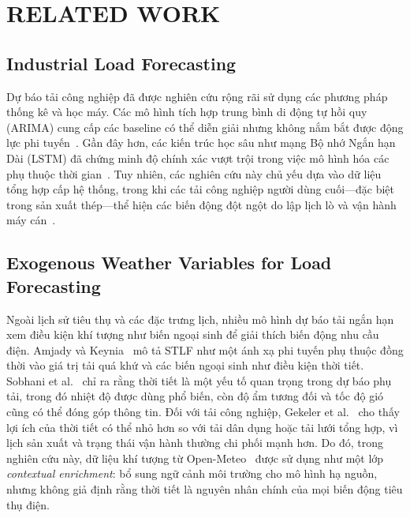 \documentclass[conference]{IEEEtran}
\begin{document}
\section{RELATED WORK}
\label{sec:related}

\subsection{Industrial Load Forecasting}

Dự báo tải công nghiệp đã được nghiên cứu rộng rãi sử dụng các phương pháp thống kê và học máy. Các mô hình tích hợp trung bình di động tự hồi quy (ARIMA) cung cấp các baseline có thể diễn giải nhưng không nắm bắt được động lực phi tuyến~\cite{hippert2001}. Gần đây hơn, các kiến trúc học sâu như mạng Bộ nhớ Ngắn hạn Dài (LSTM) đã chứng minh độ chính xác vượt trội trong việc mô hình hóa các phụ thuộc thời gian~\cite{bouktif2020}. Tuy nhiên, các nghiên cứu này chủ yếu dựa vào dữ liệu tổng hợp cấp hệ thống, trong khi các tải công nghiệp người dùng cuối---đặc biệt trong sản xuất thép---thể hiện các biến động đột ngột do lập lịch lò và vận hành máy cán~\cite{khuntia2016}.

\subsection{Exogenous Weather Variables for Load Forecasting}

Ngoài lịch sử tiêu thụ và các đặc trưng lịch, nhiều mô hình dự báo tải ngắn hạn xem điều kiện khí tượng như biến ngoại sinh để giải thích biến động nhu cầu điện. Amjady và Keynia~\cite{amjady2011} mô tả STLF như một ánh xạ phi tuyến phụ thuộc đồng thời vào giá trị tải quá khứ và các biến ngoại sinh như điều kiện thời tiết. Sobhani et al.~\cite{sobhani2019weather} chỉ ra rằng thời tiết là một yếu tố quan trọng trong dự báo phụ tải, trong đó nhiệt độ được dùng phổ biến, còn độ ẩm tương đối và tốc độ gió cũng có thể đóng góp thông tin. Đối với tải công nghiệp, Gekeler et al.~\cite{gekeler2025weather} cho thấy lợi ích của thời tiết có thể nhỏ hơn so với tải dân dụng hoặc tải lưới tổng hợp, vì lịch sản xuất và trạng thái vận hành thường chi phối mạnh hơn. Do đó, trong nghiên cứu này, dữ liệu khí tượng từ Open-Meteo~\cite{openmeteo2026} được sử dụng như một lớp \textit{contextual enrichment}: bổ sung ngữ cảnh môi trường cho mô hình hạ nguồn, nhưng không giả định rằng thời tiết là nguyên nhân chính của mọi biến động tiêu thụ điện.
\end{document}
